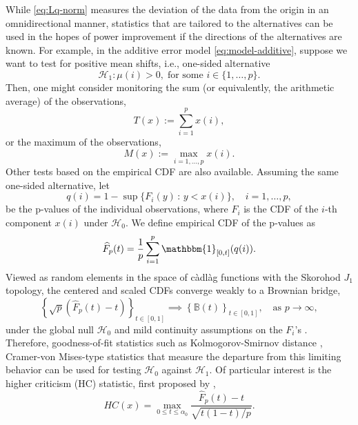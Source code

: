 While \eqref{eq:Lq-norm} measures the deviation of the data from the origin in an omnidirectional manner, statistics that are tailored to the alternatives can be used in the hopes of power improvement if the directions of the alternatives are known.
For example, in the additive error model \eqref{eq:model-additive}, suppose we want to test for positive mean shifts, i.e., one-sided alternative
\begin{equation} \label{eq:global-test-one-sided}
    \mathcal{H}_1: \mu(i)> 0, \; \text{for some }i\in\{1,\ldots,p\}.
\end{equation}
Then, one might consider monitoring the sum (or equivalently, the arithmetic average) of the observations, 
\begin{equation} \label{eq:sum-statistic}
    T(x) := \sum_{i=1}^p{x(i)},
\end{equation}
or the maximum of the observations,
\begin{equation} \label{eq:max-statistic}
    M(x) := \max_{i=1,\ldots,p}{x(i)}.
\end{equation}
Other tests based on the empirical \ac{CDF} are also available.
Assuming the same one-sided alternative, let 
\begin{equation}
    q(i) = 1 - \sup\{F_i(y)\,:\,y<x(i)\}, \quad i = 1,\ldots,p,
\end{equation}
be the p-values of the individual observations, where $F_i$ is the \ac{CDF} of the $i$-th component $x(i)$ under $\mathcal{H}_0$.
We define empirical \ac{CDF} of the p-values as
\begin{equation}
    \widehat{F}_p(t) = 
    \frac{1}{p} \sum_{i=1}^p \mathbbm{1}_{[0, t]}(q(i)).
\end{equation}
Viewed as random elements in the space of c\`adl\`ag functions with the Skorohod $J_1$ topology, the centered and scaled \ac{CDF}s converge weakly to a Brownian bridge,
\begin{equation*}
    \left\{\sqrt{p}\left(\widehat{F}_p(t) - t\right)\right\}_{t\in[0,1]} 
    \implies
    \left\{\mathbb{B}(t)\right\}_{t\in[0,1]},\ \ \ \mbox{ as } p\to\infty,
\end{equation*}
under the global null $\mathcal{H}_0$ and mild continuity assumptions on the $F_i$'s \citep{skorokhod1956limit}. 
Therefore, goodness-of-fit statistics such as Kolmogorov-Smirnov distance \citep{smirnov1948table}, Cramer-von Mises-type statistics \citep{cramer1928composition, anderson1952asymptotic} that measure the departure from this limiting behavior can be used for testing $\mathcal{H}_0$ against $\mathcal{H}_1$.
Of particular interest is the higher criticism (\ac{HC}) statistic, first proposed by \cite{tukey1976lecture},
\begin{equation} \label{eq:HC-statistic}
    HC(x) = 
    \max_{0\le t\le\alpha_0}\frac{\widehat{F}_p(t) - t}{\sqrt{t(1 - t)/p}}.
\end{equation}

